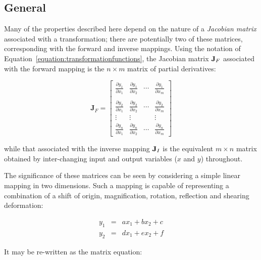 \documentclass[twoside,11pt]{article}
\newcommand{\xlabel}[1]{}
\newcommand{\pdiff}[2]{\frac{\partial y_{#1}}{\partial x_{#2}}}
\begin{document}
\subsection{\xlabel{general}General}

Many of the properties described here depend on the nature of a \emph{Jacobian
matrix} associated with a transformation; there are potentially two
of these matrices, corresponding with the forward and inverse mappings. 
Using the notation of Equation~\ref{equation:transformationfunctions}, the
Jacobian matrix ${\bf J}_F$ associated with the forward mapping is the
\mbox{$n \times m$} matrix of partial derivatives: 

\begin{equation}
\textbf{J}_F = \left[ \begin{array}{cccc}
\pdiff{1}{1} & \pdiff{1}{2} & \cdots & \pdiff{1}{m} \\
             &              &        &              \\
\pdiff{2}{1} & \pdiff{2}{2} & \cdots & \pdiff{2}{m} \\
\vdots       & \vdots       &        & \vdots       \\
\pdiff{n}{1} & \pdiff{n}{2} & \cdots & \pdiff{n}{m}
\end{array} \right]
\end{equation}

while that associated with the inverse mapping ${\bf J}_I$ is the equivalent
\mbox{$m \times n$} matrix obtained by inter-changing input and output
variables ($x$ and $y$) throughout. 

The significance of these matrices can be seen by considering a simple
linear mapping in two dimensions.
Such a mapping is capable of representing a combination of a shift of
origin, magnification, rotation, reflection and shearing deformation: 

\begin{equation}
\begin{array}{lll}
y_1 & = & a x_1 + b x_2 + c \\
y_2 & = & d x_1 + e x_2 + f
\end{array}
\end{equation}

It may be re-written as the matrix equation: 
\end{document}
